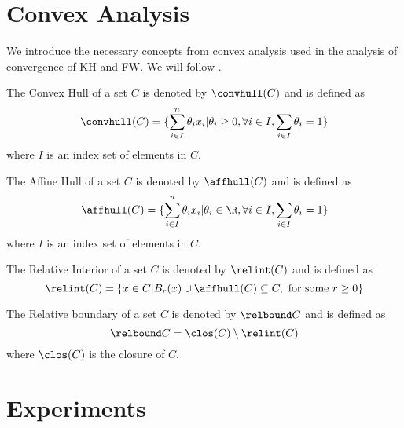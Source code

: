 \section{Convex Analysis}
We introduce the necessary concepts from convex analysis used in the analysis of
convergence of KH and FW. We will follow \cite{boyd04_convex}.

\begin{definition}
  \label{def:conv-hull}
  The Convex Hull of a set \(C\) is denoted by \(\convhull(C)\) and is defined as
  \begin{equation}
    \label{eq:conv-hull}
    \convhull(C) = \{ \sum_{i \in I}^n \theta_{i} x_i | \theta_i \geq 0, \forall i \in I, \sum_{i \in I} \theta_i = 1 \}
  \end{equation}
  where \(I\) is an index set of elements in \(C\).
\end{definition}

\begin{definition}
  \label{def:aff-hull}
  The Affine Hull of a set \(C\) is denoted by \(\affhull(C)\) and is defined as
  \begin{equation}
    \label{eq:aff-hull}
    \affhull(C) = \{ \sum_{i \in I}^n \theta_{i} x_i | \theta_i \in \R, \forall i \in I, \sum_{i \in I} \theta_i = 1 \}
  \end{equation}
  where \(I\) is an index set of elements in \(C\).
\end{definition}

\begin{definition}
  \label{def:relative-interior}
  The Relative Interior of a set \(C\) is denoted by \(\relint(C)\) and is defined as
  \begin{equation}
    \label{eq:relative-interior}
    \relint(C) = \{x \in C | B_{r}(x) \cup \affhull(C) \subseteq C, \text{ for some } r \geq 0\}
  \end{equation}
\end{definition}

\begin{definition}
  \label{def:relative-boundary}
  The Relative boundary of a set \(C\) is denoted by \(\relbound C\) and is defined as
  \begin{equation}
    \label{eq:relative-boundary}
    \relbound C = \clos(C) \setminus \relint(C)
  \end{equation}
  where \(\clos(C)\) is the closure of \(C\).
\end{definition}

\section{Experiments}
